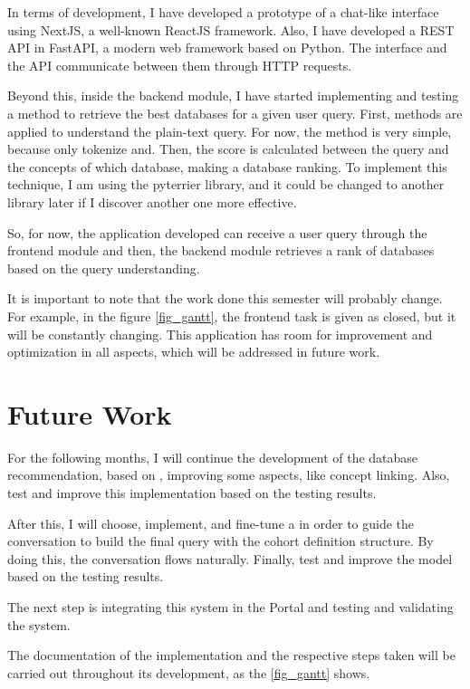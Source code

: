 In terms of development, I have developed a prototype of a chat-like interface using NextJS, a well-known ReactJS framework. Also, I have developed a REST API in FastAPI, a modern web framework based on Python. The interface and the API communicate between them through HTTP requests.

Beyond this, inside the backend module, I have started implementing and testing a {\bm} method to retrieve the best databases for a given user query. First, {\nlp} methods are applied to understand the plain-text query. For now, the {\nlp} method is very simple, because only tokenize and. Then, the {\bm} score is calculated between the query and the concepts of which database, making a database ranking. To implement this {\ir} technique, I am using the pyterrier library, and it could be changed to another library later if I discover another one more effective.
 
So, for now, the application developed can receive a user query through the frontend module and then, the backend module retrieves a rank of databases based on the query understanding. 

It is important to note that the work done this semester will probably change. For example, in the figure \ref{fig_gantt}, the frontend task is given as closed, but it will be constantly changing. This application has room for improvement and optimization in all aspects, which will be addressed in future work.



\section{Future Work}

For the following months, I will continue the development of the database recommendation, based on {\bm}, improving some aspects, like concept linking. Also, test and improve this {\ir} implementation based on the testing results. 

After this, I will choose, implement, and fine-tune a {\llm} in order to guide the conversation to build the final query with the cohort definition structure. By doing this, the conversation flows naturally. Finally, test and improve the model based on the testing results.

The next step is integrating this system in the {\ehden} Portal and testing and validating the system. 

The documentation of the implementation and the respective steps taken will be carried out throughout its development, as the \ref{fig_gantt} shows.

